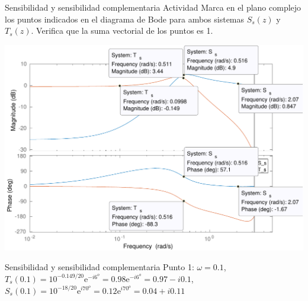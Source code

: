 \documentclass[presentation,aspectratio=169]{beamer}
\begin{document}
\begin{frame}[label={sec:org5c57d5f}]{Sensibilidad y sensibilidad complementaria}
\alert{Actividad} Marca en el plano complejo los puntos indicados en el diagrama de Bode para ambos sistemas \(S_s(z)\) y \(T_s(z)\). Verifica que la suma vectorial de los puntos es 1.
\begin{center}
\includegraphics[width=0.7\linewidth]{../matlab/bode-sensitivity-exercise-crop}
\end{center}
\end{frame}

\begin{frame}[label={sec:org2b09be9}]{Sensibilidad y sensibilidad complementaria}
\alert{Punto 1:} \(\omega=0.1\), \(T_s(0.1) = 10^{-0.149/20}\mathrm{e}^{-i6^o} = 0.98\mathrm{e}^{-i6^o} = 0.97 - i0.1\), \(S_s(0.1) = 10^{-18/20}\mathrm{e}^{i70^o} = 0.12\mathrm{e}^{i70^o} = 0.04 + i0.11\)
\begin{center}
\end{center}
\end{frame}
\end{document}

